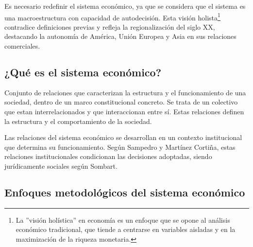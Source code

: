 \documentclass[12pt]{report} %
\begin{document}
Es necesario redefinir el sistema económico, ya que se considera que el
sistema es una macroestructura con capacidad de autodecisión. Esta
visión
holista\footnote{La ''visión holística'' en economía es un enfoque que se opone al análisis económico tradicional, que tiende a centrarse en variables aisladas y en la maximización de la riqueza monetaria.}
contradice definiciones previas y refleja la regionalización del siglo
XX, destacando la autonomía de América, Unión Europea y Asia en sus
relaciones comerciales.

\hypertarget{quuxe9-es-el-sistema-econuxf3mico}{%
\subsection{¿Qué es el sistema
económico?}\label{quuxe9-es-el-sistema-econuxf3mico}}

Conjunto de relaciones que caracterizan la estructura y el
funcionamiento de una sociedad, dentro de un marco constitucional
concreto. Se trata de un colectivo que estan interrelacionados y que
interaccionan entre sí. Estas relaciones definen la estructura y el
comportamiento de la sociedad.

Las relaciones del sistema económico se desarrollan en un contexto
institucional que determina su funcionamiento. Según Sampedro y Martínez
Cortiña, estas relaciones institucionales condicionan las decisiones
adoptadas, siendo jurídicamente sociales según Sombart.

\hypertarget{enfoques-metodoluxf3gicos-del-sistema-econuxf3mico}{%
\subsection{Enfoques metodológicos del sistema
económico}\label{enfoques-metodoluxf3gicos-del-sistema-econuxf3mico}}
\end{document}
